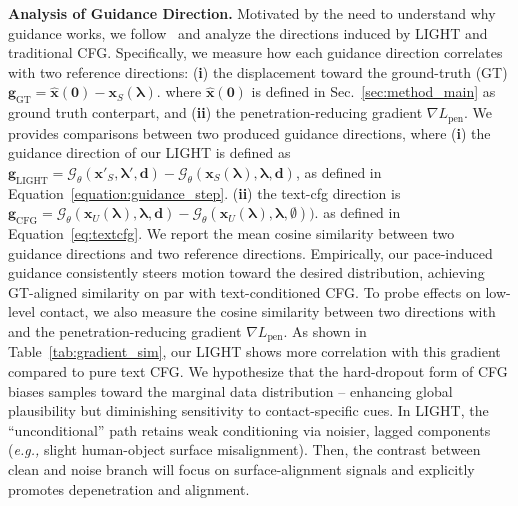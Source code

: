 
\noindent\textbf{Analysis of Guidance Direction.}
Motivated by the need to understand why guidance works, we follow~\citep{rajabi2025token} and analyze the directions induced by LIGHT and traditional CFG. Specifically, we measure how each guidance direction correlates with two reference directions: (\textbf{i}) the displacement toward the ground-truth (GT) \(
\boldsymbol{g}_{\text{GT}} = \hat{\boldsymbol{x}}(\boldsymbol{0}) - \boldsymbol{x}_{S}(\boldsymbol\lambda).
\) where $\hat{\boldsymbol{x}}(\boldsymbol{0})$ is defined in Sec.~\ref{sec:method_main} as ground truth conterpart, and (\textbf{ii}) the penetration-reducing gradient $\nabla L_{\text{pen}}$. 
We provides comparisons between two produced guidance directions, where (\textbf{i}) the guidance direction of our LIGHT is defined as
\(
\boldsymbol{g}_{\text{LIGHT}}
= \mathcal{G}_\theta(\boldsymbol{x}'_{S}, \boldsymbol\lambda',\boldsymbol{d})
-\mathcal{G}_\theta(\boldsymbol{x}_{S}(\boldsymbol\lambda), \boldsymbol\lambda,\boldsymbol{d})
\), as defined in Equation~\ref{equation:guidance_step}.
(\textbf{ii}) the text-cfg direction is
\(
\boldsymbol{g}_{\text{CFG}}
= \mathcal{G}_\theta(\boldsymbol{x}_{U}(\boldsymbol\lambda), \boldsymbol\lambda,\boldsymbol{d})
-\mathcal{G}_\theta(\boldsymbol{x}_{U}(\boldsymbol\lambda), \boldsymbol\lambda,\emptyset)\big).
\) as defined in Equation~\ref{eq:textcfg}.
We report the mean cosine similarity between two guidance directions and two reference directions. Empirically, our pace-induced guidance consistently steers motion toward the desired distribution, achieving GT-aligned similarity on par with text-conditioned CFG. To probe effects on low-level contact, we also measure the cosine similarity between two directions with and the penetration-reducing gradient $\nabla L_{\text{pen}}$. As shown in Table~\ref{tab:gradient_sim}, our LIGHT shows more correlation with this gradient compared to pure text CFG. We hypothesize that the hard-dropout form of CFG biases samples toward the marginal data distribution -- enhancing global plausibility but diminishing sensitivity to contact-specific cues. In LIGHT, the ``unconditional'' path retains weak conditioning via noisier, lagged components (\textit{e.g.,} slight human-object surface misalignment). Then, the contrast between clean and noise branch will focus on surface-alignment signals and explicitly promotes depenetration and alignment.
